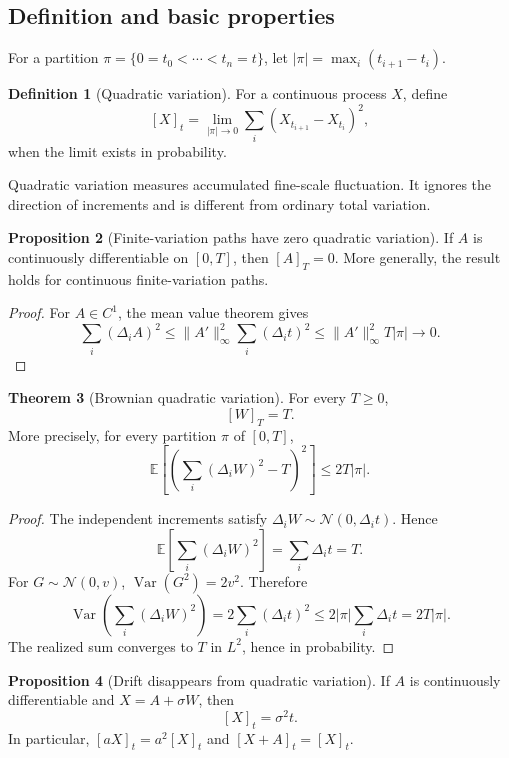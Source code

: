 \documentclass[10pt]{article}
\newcommand{\E}{\mathbb E}
\newcommand{\Var}{\operatorname{Var}}
\newcommand{\1}{\mathbf 1}
\theoremstyle{definition}
\newtheorem{definition}{Definition}[section]
\newtheorem{proposition}[definition]{Proposition}
\newtheorem{theorem}[definition]{Theorem}
\begin{document}
\subsection{Definition and basic properties}

For a partition \(\pi=\{0=t_0<\cdots<t_n=t\}\), let
\(|\pi|=\max_i(t_{i+1}-t_i)\).

\begin{definition}[Quadratic variation]
For a continuous process \(X\), define
\[
[X]_t
=\lim_{|\pi|\to0}\sum_i(X_{t_{i+1}}-X_{t_i})^2,
\]
when the limit exists in probability.
\end{definition}

Quadratic variation measures accumulated fine-scale fluctuation. It ignores
the direction of increments and is different from ordinary total variation.

\begin{proposition}[Finite-variation paths have zero quadratic variation]
If \(A\) is continuously differentiable on \([0,T]\), then \([A]_T=0\).
More generally, the result holds for continuous finite-variation paths.
\end{proposition}

\begin{proof}
For \(A\in C^1\), the mean value theorem gives
\[
\sum_i(\Delta_iA)^2
\leq\|A'\|_\infty^2\sum_i(\Delta_it)^2
\leq\|A'\|_\infty^2T|\pi|\longrightarrow0.
\]
\end{proof}

\begin{theorem}[Brownian quadratic variation]
For every \(T\geq0\),
\[
\boxed{[W]_T=T.}
\]
More precisely, for every partition \(\pi\) of \([0,T]\),
\[
\E\!\left[
\left(\sum_i(\Delta_iW)^2-T\right)^2
\right]
\leq2T|\pi|.
\]
\end{theorem}

\begin{proof}
The independent increments satisfy
\(\Delta_iW\sim\mathcal N(0,\Delta_it)\). Hence
\[
\E\!\left[\sum_i(\Delta_iW)^2\right]
=\sum_i\Delta_it=T.
\]
For \(G\sim\mathcal N(0,v)\), \(\Var(G^2)=2v^2\). Therefore
\[
\Var\!\left(\sum_i(\Delta_iW)^2\right)
=2\sum_i(\Delta_it)^2
\leq2|\pi|\sum_i\Delta_it
=2T|\pi|.
\]
The realized sum converges to \(T\) in \(L^2\), hence in probability.
\end{proof}

\begin{proposition}[Drift disappears from quadratic variation]
If \(A\) is continuously differentiable and \(X=A+\sigma W\), then
\[
[X]_t=\sigma^2t.
\]
In particular, \([aX]_t=a^2[X]_t\) and \([X+A]_t=[X]_t\).
\end{proposition}
\end{document}
